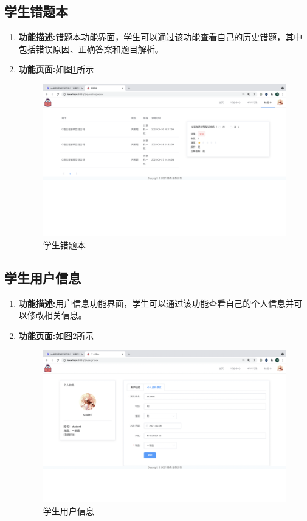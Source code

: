 \subsection{学生错题本}
\begin{enumerate}
	\item[] \textbf{功能描述:}错题本功能界面，学生可以通过该功能查看自己的历史错题，其中包括错误原因、正确答案和题目解析。
	\item[] \textbf{功能页面:}如图\ref{figure:scuotiben}所示 \\
		\begin{figure}[H]
			\centering
			\includegraphics[width=1.0\textwidth,keepaspectratio]{data/chapter-5/student/cuotiben.png}
			\caption{学生错题本}
			\label{figure:scuotiben}
		\end{figure}
\end{enumerate}

\subsection{学生用户信息}
\begin{enumerate}
	\item[] \textbf{功能描述:}用户信息功能界面，学生可以通过该功能查看自己的个人信息并可以修改相关信息。
	\item[] \textbf{功能页面:}如图\ref{figure:sxinxi}所示 \\
		\begin{figure}[H]
			\centering
			\includegraphics[width=1.0\textwidth,keepaspectratio]{data/chapter-5/student/yonghuxinxi.png}
			\caption{学生用户信息}
			\label{figure:sxinxi}
		\end{figure}
\end{enumerate}

